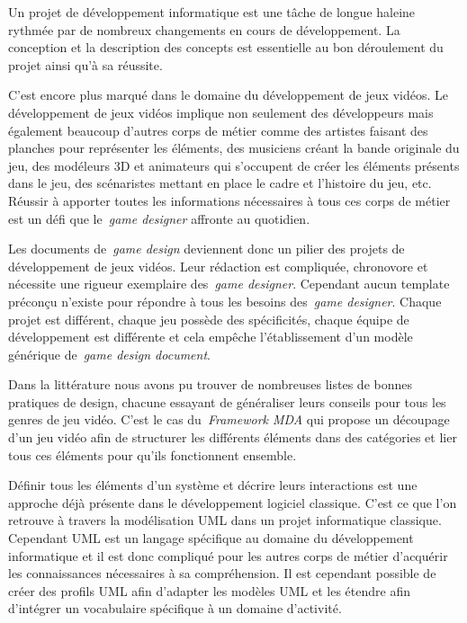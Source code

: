 \begin{conclusion}

Un projet de développement informatique est une tâche de longue haleine rythmée par de nombreux changements en cours de développement.
La conception et la description des concepts est essentielle au bon déroulement du projet ainsi qu'à sa réussite.

C'est encore plus marqué dans le domaine du développement de jeux vidéos.
Le développement de jeux vidéos implique non seulement des développeurs mais également beaucoup d'autres corps de métier comme des artistes faisant des planches pour représenter les éléments, des musiciens créant la bande originale du jeu, des modéleurs 3D et animateurs qui s'occupent de créer les éléments présents dans le jeu, des scénaristes mettant en place le cadre et l'histoire du jeu, etc.
Réussir à apporter toutes les informations nécessaires à tous ces corps de métier est un défi que le~\emph{game designer} affronte au quotidien.

Les documents de~\emph{game design} deviennent donc un pilier des projets de développement de jeux vidéos.
Leur rédaction est compliquée, chronovore et nécessite une rigueur exemplaire des~\emph{game designer}.
Cependant aucun template préconçu n'existe pour répondre à tous les besoins des~\emph{game designer}.
Chaque projet est différent, chaque jeu possède des spécificités, chaque équipe de développement est différente et cela empêche l'établissement d'un modèle générique de~\emph{game design document}.

Dans la littérature nous avons pu trouver de nombreuses listes de bonnes pratiques de design, chacune essayant de généraliser leurs conseils pour tous les genres de jeu vidéo.
C'est le cas du~\emph{Framework MDA} qui propose un découpage d'un jeu vidéo afin de structurer les différents éléments dans des catégories et lier tous ces éléments pour qu'ils fonctionnent ensemble.

Définir tous les éléments d'un système et décrire leurs interactions est une approche déjà présente dans le développement logiciel classique.
C'est ce que l'on retrouve à travers la modélisation UML dans un projet informatique classique.
Cependant UML est un langage spécifique au domaine du développement informatique et il est donc compliqué pour les autres corps de métier d'acquérir les connaissances nécessaires à sa compréhension.
Il est cependant possible de créer des profils UML afin d'adapter les modèles UML et les étendre afin d'intégrer un vocabulaire spécifique à un domaine d'activité.


\end{conclusion}

